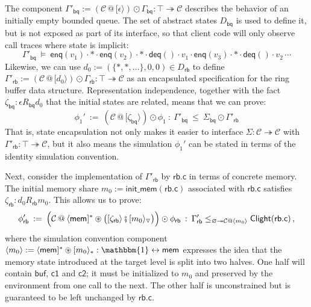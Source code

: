 \documentclass[acmsmall,screen,review,anonymous]{acmart}
\newcommand{\kw}[1]{\ensuremath{ \mathsf{#1} }}
\newcommand{\vcomp}{\fatsemi}
\newcommand{\sepconj}{\oast}
\begin{document}
\begin{example} %
The component
$\Gamma'_\kw{bq} :=
 (\mathcal{C} \mathbin@ [\epsilon\rangle) \odot \Gamma_\kw{bq} :
 \top \twoheadrightarrow \mathcal{C}$
describes the behavior of an initially empty bounded queue.
The set of abstract states $D_\kw{bq}$ is used to define it,
but is not exposed as part of its interface,
so that client code will only observe call traces
where state is implicit:
\[
  \Gamma'_\kw{bq} \: \vDash \:
    \kw{enq}(v_1) \cdot
    {*} \cdot
    \kw{enq}(v_2) \cdot
    {*} \cdot
    \kw{deq}() \cdot
    v_1 \cdot
    \kw{enq}(v_3) \cdot
    {*} \cdot
    \kw{deq}() \cdot
    v_2 \, \cdots
\]
Likewise,
we can use
$d_0 := (\{{*},{*},\ldots\}, 0, 0) \in D_\kw{rb}$
to define
$\Gamma'_\kw{rb} :=
 (\mathcal{C} \mathbin@ [d_0\rangle) \odot \Gamma_\kw{rb} :
 \top \twoheadrightarrow \mathcal{C}$
as an encapsulated specification for
the ring buffer data structure.
Representation independence, together with the fact
$\zeta_\kw{bq} : \epsilon \mathbin{R_\kw{bq}} d_0$
that the initial states are related,
means that we can prove:
\[
  \phi_1' \: := \:
  (\mathcal{C} \mathbin@ [\zeta_\kw{bq}\rangle) \odot \phi_1
  \: : \:
  \Gamma'_\kw{bq} \: \le \: \Sigma_\kw{bq} \odot \Gamma'_\kw{rb}
\]
That is,
state encapsulation not only makes it easier
to interface $\Sigma : \mathcal{C} \twoheadrightarrow \mathcal{C}$
with $\Gamma'_\kw{rb} : \top \twoheadrightarrow \mathcal{C}$,
but it also means the simulation
$\phi_1'$ can be stated in terms of the identity simulation convention.

Next, consider the implementation
of $\Gamma'_\kw{rb}$
by $\kw{rb.c}$
in terms of concrete memory.
The initial memory share $m_0 := \kw{init\_mem}(\kw{rb.c})$
associated with $\kw{rb.c}$ satisfies
$\zeta_\kw{rb} : d_0 \mathrel{R_\kw{rb}} m_0$.
This allows us to prove:
\[
  \phi_\kw{rb}' \: := \:
    \Big(
      \mathcal{C} \mathbin@
      \langle \kw{mem} ]^* \sepconj
      \big(
        [\zeta_\kw{rb} \rangle \vcomp [m_0\rangle_\triangledown
      \big)
    \Big) \odot \phi_\kw{rb}
  \: : \:
  \Gamma'_\kw{rb}
    \le_{\varnothing \twoheadrightarrow
      \mathcal{C} \mathbin@
        \langle m_0 \rangle}
    \kw{Clight}(\kw{rb.c})
  \,,
\]
where the simulation convention component
$\langle m_0 \rangle :=
 \langle \kw{mem} ]^* \sepconj [m_0\rangle_* :
 \mathbbm{1} \leftrightarrow \kw{mem}$
expresses the idea that
the memory state introduced at the target level is split into two halves.
One half will contain $\kw{buf}$, $\kw{c1}$ and $\kw{c2}$;
it must be initialized to $m_0$
and preserved by the environment from one call to the next.
The other half is unconstrained
but is guaranteed to be left unchanged by $\kw{rb.c}$.


\end{example}
\end{document}
